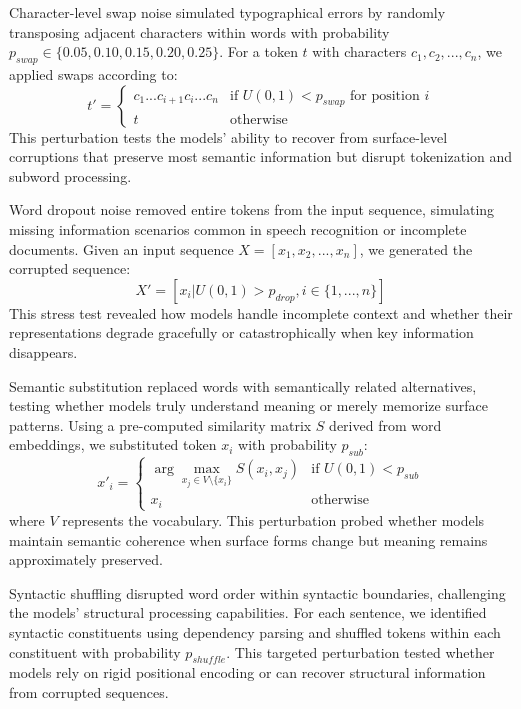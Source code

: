 Character-level swap noise simulated typographical errors by randomly transposing adjacent characters within words with probability $p_{swap} \in \{0.05, 0.10, 0.15, 0.20, 0.25\}$. For a token $t$ with characters $c_1, c_2, ..., c_n$, we applied swaps according to:
\begin{equation}
t' = \begin{cases}
c_1...c_{i+1}c_i...c_n & \text{if } U(0,1) < p_{swap} \text{ for position } i \\
t & \text{otherwise}
\end{cases}
\end{equation}
This perturbation tests the models' ability to recover from surface-level corruptions that preserve most semantic information but disrupt tokenization and subword processing.

Word dropout noise removed entire tokens from the input sequence, simulating missing information scenarios common in speech recognition or incomplete documents. Given an input sequence $X = [x_1, x_2, ..., x_n]$, we generated the corrupted sequence:
\begin{equation}
X' = [x_i | U(0,1) > p_{drop}, i \in \{1, ..., n\}]
\end{equation}
This stress test revealed how models handle incomplete context and whether their representations degrade gracefully or catastrophically when key information disappears.

Semantic substitution replaced words with semantically related alternatives, testing whether models truly understand meaning or merely memorize surface patterns. Using a pre-computed similarity matrix $S$ derived from word embeddings, we substituted token $x_i$ with probability $p_{sub}$:
\begin{equation}
x'_i = \begin{cases}
\arg\max_{x_j \in V \setminus \{x_i\}} S(x_i, x_j) & \text{if } U(0,1) < p_{sub} \\
x_i & \text{otherwise}
\end{cases}
\end{equation}
where $V$ represents the vocabulary. This perturbation probed whether models maintain semantic coherence when surface forms change but meaning remains approximately preserved.

Syntactic shuffling disrupted word order within syntactic boundaries, challenging the models' structural processing capabilities. For each sentence, we identified syntactic constituents using dependency parsing and shuffled tokens within each constituent with probability $p_{shuffle}$. This targeted perturbation tested whether models rely on rigid positional encoding or can recover structural information from corrupted sequences.

